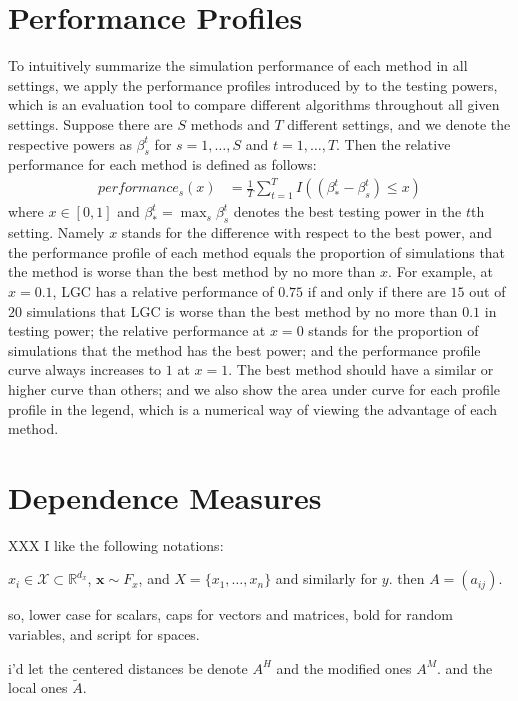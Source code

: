 \documentclass[11pt]{article}
\providecommand{\mt}[1]{\widetilde{#1}}
\providecommand{\mb}[1]{\boldsymbol{#1}}
\providecommand{\mc}[1]{\mathcal{#1}}
\newcommand{\Real}{\mathbb{R}}
\begin{document}
\section{Performance Profiles}

To intuitively summarize the simulation performance of each method in all settings, we apply the performance profiles introduced by \cite{DolanMore2002} to the testing powers, which is an evaluation tool to compare different algorithms throughout all given settings. Suppose there are $S$ methods and $T$ different settings, and we denote the respective powers as $\beta_{s}^{t}$ for $s=1,\ldots,S$ and $t=1,\ldots,T$. Then the relative performance for each method is defined as follows:
\begin{align*}
performance_{s}(x) &= \frac{1}{T} \sum_{t=1}^{T} I((\beta_{*}^{t}-\beta_{s}^{t}) \leq x)
\end{align*}
where $x \in [0,1]$ and $\beta_{*}^{t} =\max_{s} \beta_{s}^{t}$ denotes the best testing power in the $t$th setting. Namely $x$ stands for the difference with respect to the best power, and the performance profile of each method equals the proportion of simulations that the method is worse than the best method by no more than $x$. For example, at $x=0.1$, LGC has a relative performance of $0.75$ if and only if there are $15$ out of $20$ simulations that LGC is worse than the best method by no more than $0.1$ in testing power; the relative performance at $x=0$ stands for the proportion of simulations that the method has the best power; and the performance profile curve always increases to $1$ at $x=1$. The best method should have a similar or higher curve than others; and we also show the area under curve for each profile profile in the legend, which is a numerical way of viewing the advantage of each method.

\section{Dependence Measures}
\label{main}

XXX I like the following notations:

$x_i \in \mc{X} \subset \Real^{d_x}$, $\mb{x} \sim F_x$, and $X=\{x_1,\ldots,x_n\}$ and similarly for $y$. then $A=(a_{ij})$. 

so, lower case for scalars, caps for vectors and matrices, bold for random variables, and script for spaces.  

i'd let the centered distances be denote $A^H$ and the modified ones $A^M$.
and the local ones $\mt{A}$.
\end{document}
